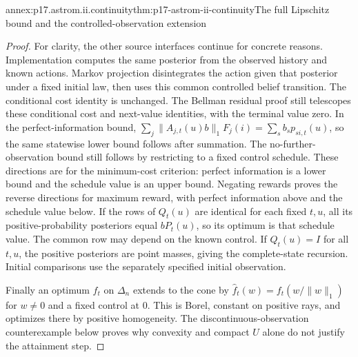 \begin{annexitem}{annex:p17.astrom.ii.continuity}{thm:p17-astrom-ii-continuity}{The full Lipschitz bound and the controlled-observation extension}
\begin{proof}
For clarity, the other source interfaces continue
for concrete reasons. Implementation computes the
same posterior from the observed history and known
actions. Markov projection disintegrates the action
given that posterior under a fixed initial law,
then uses this common controlled belief transition.
The conditional cost identity is unchanged.
The Bellman residual proof still telescopes these
conditional cost and next-value identities, with
the terminal value zero.
In the perfect-information bound,
\(\sum_j\|A_{j,t}(u)b\|_1F_j(i)
 =\sum_s b_sp_{si,t}(u)\), so the same
statewise lower bound follows after summation.
The no-further-observation bound still follows
by restricting to a fixed control schedule.
These directions are for the minimum-cost criterion:
perfect information is a lower bound and the schedule
value is an upper bound. Negating rewards proves the
reverse directions for maximum reward, with perfect
information above and the schedule value below.
If the rows of \(Q_t(u)\) are identical for each
fixed \(t,u\), all its positive-probability
posteriors equal \(bP_t(u)\), so its optimum
is that schedule value. The common row may
depend on the known control.
If \(Q_t(u)=I\) for all \(t,u\), the positive
posteriors are point masses, giving the
complete-state recursion. Initial comparisons
use the separately specified initial observation.

Finally an optimum \(f_t\) on \(\Delta_n\)
extends to the cone by
\(\widehat f_t(w)=f_t(w/\|w\|_1)\) for \(w\ne0\)
and a fixed control at \(0\).
This is Borel, constant on positive rays,
and optimizes there by positive homogeneity.
The discontinuous-observation counterexample
below proves why convexity and compact \(U\)
alone do not justify the attainment step.
\end{proof}
\end{annexitem}

